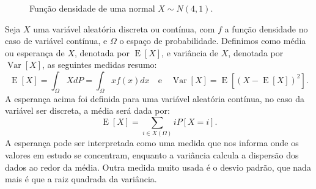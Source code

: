 \documentclass[twoside,openright,titlepage,numbers=noenddot,headinclude,  lineheaders footinclude=true,cleardoublepage=empty,
                                BCOR=5mm,paper=a4,fontsize=12pt ]{scrbook}
\theoremstyle{definition}
\DeclareMathOperator{\E}{E}
\DeclareMathOperator{\Var}{Var}
\begin{document}
\begin{figure}[h]
\centering
{}

\caption{Função densidade de uma normal $X \sim N(4,1)$.}
\label{fig:normal}
\end{figure}

Seja $X$ uma variável aleatória discreta ou contínua, com $f$ a função
densidade no caso de variável contínua, e $\Omega$ o espaço de probabilidade. 
Definimos como média ou esperança de $X$, denotada por $\E[X]$, e
variância de $X$, denotada por $\Var[X]$, as seguintes medidas resumo:
\[
\E[X] = \int_{\Omega} X dP = \int_{\Omega} xf(x)dx \quad \text{e} \quad \Var[X] = \E[ (X - \E[X] )^2].
\]
A esperança acima foi definida para uma variável aleatória contínua, no caso da variável ser discreta,
a média será dada por:
\[
\E[X] = \sum_{i \in X(\Omega)} i P[X = i].
\]
A esperança pode ser interpretada como uma medida que nos informa onde os valores em 
estudo se concentram, enquanto a variância calcula a dispersão dos dados ao redor da média.
Outra medida muito usada é o desvio padrão, que nada mais é que a raiz quadrada da variância.
\end{document}
